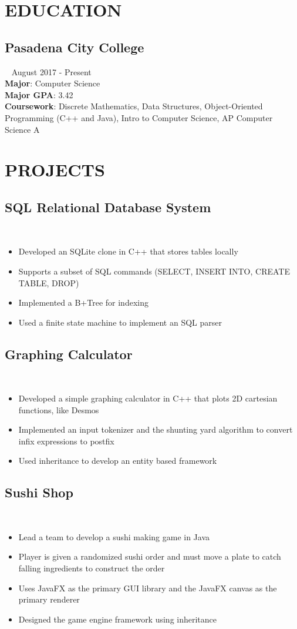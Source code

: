\documentclass{article}
\newcommand{\resumesection}[3]{
    \subsection*{#1}
    \ 
    \footnotesize
    \textcolor{wordgrey}{#2}
    \normalsize
    \hfill
    \textcolor{wordgrey}{#3}
}
\begin{document}
\pagestyle{useheader}

\section*{EDUCATION}
\resumesection{Pasadena City College}{}{August 2017 - Present}\\
\textbf{Major}: Computer Science\\
\textbf{Major GPA}: 3.42\\
\textbf{Coursework}: Discrete Mathematics, Data Structures, Object-Oriented Programming (C++ and Java), Intro to Computer Science, AP Computer Science A
\\
\section*{PROJECTS}
\resumesection{SQL Relational Database System}{}{}
\begin{itemize}
    \item Developed an SQLite clone in C++ that stores tables locally
    \item Supports a subset of SQL commands (SELECT, INSERT INTO, CREATE TABLE, DROP) 
    \item Implemented a B+Tree for indexing
    \item Used a finite state machine to implement an SQL parser
\end{itemize}

\resumesection{Graphing Calculator}{}{}
\begin{itemize}
    \item Developed a simple graphing calculator in C++ that plots 2D cartesian functions, like Desmos
    \item Implemented an input tokenizer and the shunting yard algorithm to convert infix expressions to postfix
    \item Used inheritance to develop an entity based framework
\end{itemize}

\resumesection{Sushi Shop}{}{}
\begin{itemize}
    \item Lead a team to develop a sushi making game in Java
    \item Player is given a randomized sushi order and must move a plate to catch falling ingredients to construct the order
    \item Uses JavaFX as the primary GUI library and the JavaFX canvas as the primary renderer 
    \item Designed the game engine framework using inheritance
\end{itemize}
\hfill
\end{document}
